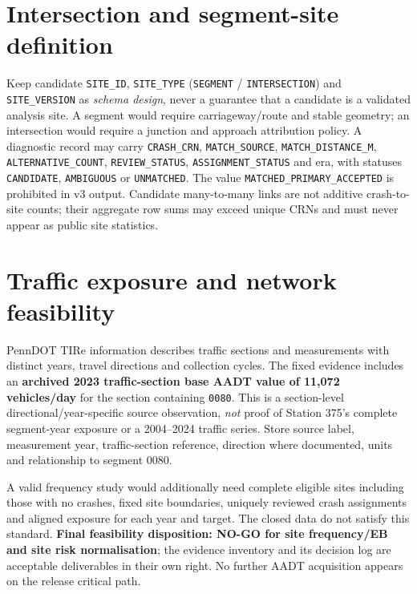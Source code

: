 \documentclass[11pt,a4paper,openany]{report}
\newcommand{\pathcode}[1]{\nolinkurl{#1}}
\begin{document}
\section{Intersection and segment-site definition}
Keep candidate \pathcode{SITE_ID}, \pathcode{SITE_TYPE} (\pathcode{SEGMENT} / \pathcode{INTERSECTION}) and \pathcode{SITE_VERSION} as \emph{schema design}, never a guarantee that a candidate is a validated analysis site. A segment would require carriageway/route and stable geometry; an intersection would require a junction and approach attribution policy. A diagnostic record may carry \pathcode{CRASH_CRN}, \pathcode{MATCH_SOURCE}, \pathcode{MATCH_DISTANCE_M}, \pathcode{ALTERNATIVE_COUNT}, \pathcode{REVIEW_STATUS}, \pathcode{ASSIGNMENT_STATUS} and era, with statuses \pathcode{CANDIDATE}, \pathcode{AMBIGUOUS} or \pathcode{UNMATCHED}. The value \pathcode{MATCHED_PRIMARY_ACCEPTED} is prohibited in v3 output. Candidate many-to-many links are not additive crash-to-site counts; their aggregate row sums may exceed unique CRNs and must never appear as public site statistics.

\section{Traffic exposure and network feasibility}
PennDOT TIRe information \cite{TIRe} describes traffic sections and measurements with distinct years, travel directions and collection cycles. The fixed evidence includes an \textbf{archived 2023 traffic-section base AADT value of 11,072 vehicles/day} for the section containing \pathcode{0080}. This is a section-level directional/year-specific source observation, \emph{not} proof of Station 375's complete segment-year exposure or a 2004--2024 traffic series. Store source label, measurement year, traffic-section reference, direction where documented, units and relationship to segment 0080.

A valid frequency study would additionally need complete eligible sites including those with no crashes, fixed site boundaries, uniquely reviewed crash assignments and aligned exposure for each year and target. The closed data do not satisfy this standard. \textbf{Final feasibility disposition: NO-GO for site frequency/EB and site risk normalisation}; the evidence inventory and its decision log are acceptable deliverables in their own right. No further AADT acquisition appears on the release critical path.
\end{document}
